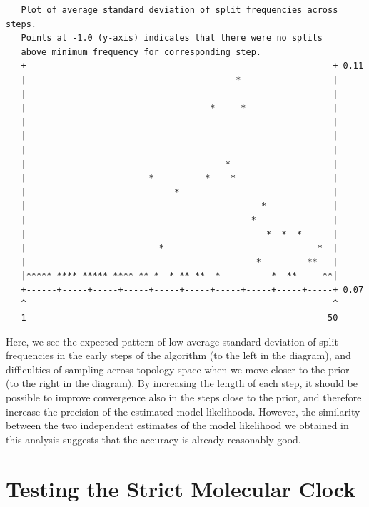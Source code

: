 \documentclass[12pt]{book}
\begin{document}
\small
\begin{singlespacing}
\begin{verbatim}
   Plot of average standard deviation of split frequencies across steps.
   Points at -1.0 (y-axis) indicates that there were no splits
   above minimum frequency for corresponding step.
   +------------------------------------------------------------+ 0.11
   |                                         *                  |
   |                                                            |
   |                                    *     *                 |
   |                                                            |
   |                                                            |
   |                                                            |
   |                                       *                    |
   |                        *          *    *                   |
   |                             *                              |
   |                                              *             |
   |                                            *               |
   |                                               *  *  *      |
   |                          *                              *  |
   |                                             *         **   |
   |***** **** ***** **** ** *  * ** **  *          *  **     **|
   +------+-----+-----+-----+-----+-----+-----+-----+-----+-----+ 0.07
   ^                                                            ^
   1                                                           50
\end{verbatim}
\end{singlespacing}
\normalsize

Here, we see the expected pattern of low average standard deviation of split frequencies in the early steps of the
algorithm (to the left in the diagram), and difficulties of sampling across topology space when we move closer
to the prior (to the right in the diagram). By increasing the length of each step, it should be
possible to improve convergence also in the steps close to the prior, and therefore increase the precision of the
estimated model likelihoods. However, the similarity between the two independent estimates of the model
likelihood we obtained in this analysis suggests that the accuracy is already reasonably good.


\section{Testing the Strict Molecular Clock}
\label{strictClock}
\end{document}
